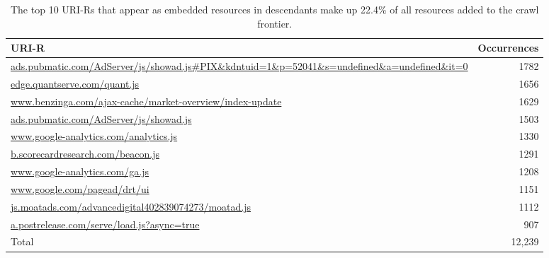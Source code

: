 \documentclass{sig-alternate}
\begin{document}




\begin{table}
\centering
\begin{tabular}{ p{5cm} | r}
\textbf{URI-R} & \textbf{Occurrences} \\
\hline
\hline
\url{ads.pubmatic.com/AdServer/js/showad.js#PIX&kdntuid=1&p=52041&s=undefined&a=undefined&it=0} & 1782 \\
\hline
\url{edge.quantserve.com/quant.js} & 1656 \\
\hline
\url{www.benzinga.com/ajax-cache/market-overview/index-update} & 1629 \\
\hline
\url{ads.pubmatic.com/AdServer/js/showad.js} & 1503 \\
\hline
\url{www.google-analytics.com/analytics.js} & 1330 \\
\hline
\url{b.scorecardresearch.com/beacon.js} & 1291 \\
\hline
\url{www.google-analytics.com/ga.js} & 1208 \\
\hline
\url{www.google.com/pagead/drt/ui} & 1151 \\
\hline
\url{js.moatads.com/advancedigital402839074273/moatad.js} & 1112 \\
\hline
\url{a.postrelease.com/serve/load.js?async=true} &  907\\
\hline
\hline
Total &  12,239\\
\hline
\end{tabular}
  \caption{The top 10 URI-Rs that appear as embedded resources in descendants make up 22.4\% of all resources added to the crawl frontier. }
  \label{counts}
\end{table}
\end{document}
